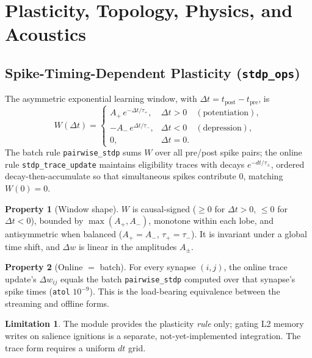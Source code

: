 \documentclass[11pt]{article}
\theoremstyle{definition}
\newtheorem{property}{Property}[section]
\newtheorem{limitation}{Limitation}[section]
\newcommand{\code}[1]{\texttt{#1}}
\begin{document}
\section{Plasticity, Topology, Physics, and Acoustics}

\subsection{Spike-Timing-Dependent Plasticity (\code{stdp\_ops})}
The asymmetric exponential learning window, with
$\Delta t = t_{\text{post}}-t_{\text{pre}}$, is
\begin{equation}
W(\Delta t)=\begin{cases}
A_+\,e^{-\Delta t/\tau_+}, & \Delta t>0\quad(\text{potentiation}),\\
-A_-\,e^{\Delta t/\tau_-}, & \Delta t<0\quad(\text{depression}),\\
0, & \Delta t=0.
\end{cases}
\end{equation}
The batch rule \code{pairwise\_stdp} sums $W$ over all pre/post spike pairs;
the online rule \code{stdp\_trace\_update} maintains eligibility traces with
decays $e^{-dt/\tau_\pm}$, ordered decay-then-accumulate so that
simultaneous spikes contribute $0$, matching $W(0)=0$.

\begin{property}[Window shape]
$W$ is causal-signed ($\ge 0$ for $\Delta t>0$, $\le 0$ for $\Delta t<0$),
bounded by $\max(A_+,A_-)$, monotone within each lobe, and antisymmetric
when balanced ($A_+=A_-$, $\tau_+=\tau_-$). It is invariant under a global
time shift, and $\Delta w$ is linear in the amplitudes $A_\pm$.
\end{property}

\begin{property}[Online $=$ batch]\label{prop:stdp-equiv}
For every synapse $(i,j)$, the online trace update's $\Delta w_{ij}$ equals
the batch \code{pairwise\_stdp} computed over that synapse's spike times
(\code{atol} $10^{-9}$). This is the load-bearing equivalence between the
streaming and offline forms.
\end{property}

\begin{limitation}
The module provides the plasticity \emph{rule} only; gating L2 memory writes
on salience ignitions is a separate, not-yet-implemented integration. The
trace form requires a uniform $dt$ grid.
\end{limitation}
\end{document}
